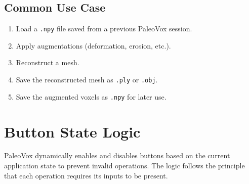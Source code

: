 \documentclass[12pt,a4paper]{article}
\begin{document}
\subsection{Common Use Case}
\begin{enumerate}
  \item Load a \texttt{.npy} file saved from a previous PaleoVox session.
  \item Apply augmentations (deformation, erosion, etc.).
  \item Reconstruct a mesh.
  \item Save the reconstructed mesh as \texttt{.ply} or \texttt{.obj}.
  \item Save the augmented voxels as \texttt{.npy} for later use.
\end{enumerate}

\section{Button State Logic}

PaleoVox dynamically enables and disables buttons based on the current application state to prevent invalid operations. The logic follows the principle that each operation requires its inputs to be present.
\end{document}
